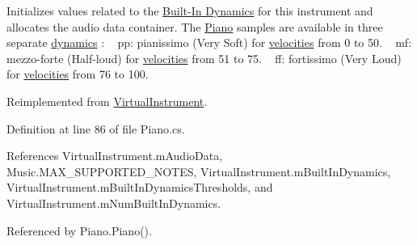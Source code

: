 Initializes values related to the \hyperlink{group___audio_DefBID}{Built-\/\+In Dynamics} for this instrument and allocates the audio data container. The \hyperlink{class_piano}{Piano} samples are available in three separate \hyperlink{group___audio_DefBID}{dynamics} \+: ~\newline
 pp\+: pianissimo (Very Soft) for \hyperlink{group___audio_DefVel}{velocities} from 0 to 50. ~\newline
 mf\+: mezzo-\/forte (Half-\/loud) for \hyperlink{group___audio_DefVel}{velocities} from 51 to 75. ~\newline
 ff\+: fortissimo (Very Loud) for \hyperlink{group___audio_DefVel}{velocities} from 76 to 100. 



Reimplemented from \hyperlink{group___v_i_base_virt_func_ga995456c03ee54543b285188c51c29a07}{Virtual\+Instrument}.



Definition at line 86 of file Piano.\+cs.



References Virtual\+Instrument.\+m\+Audio\+Data, Music.\+M\+A\+X\+\_\+\+S\+U\+P\+P\+O\+R\+T\+E\+D\+\_\+\+N\+O\+T\+ES, Virtual\+Instrument.\+m\+Built\+In\+Dynamics, Virtual\+Instrument.\+m\+Built\+In\+Dynamics\+Thresholds, and Virtual\+Instrument.\+m\+Num\+Built\+In\+Dynamics.



Referenced by Piano.\+Piano().


